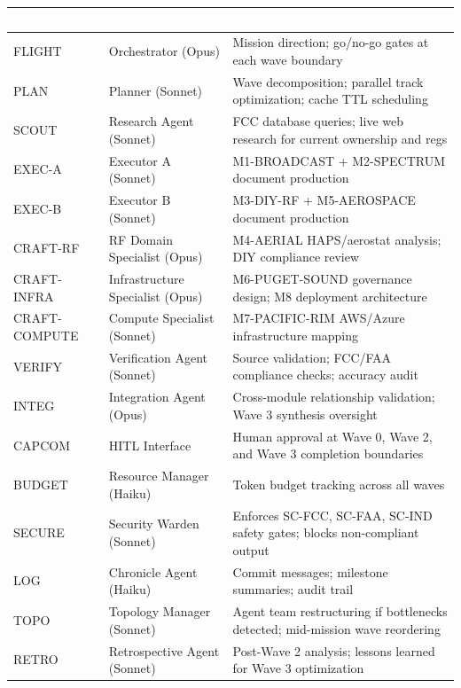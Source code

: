 \documentclass[11pt,letterpaper]{article}
\newcommand{\tableheader}[1]{\textbf{\sffamily\textcolor{white}{#1}}}
\begin{document}
\begin{center}
\begin{tabularx}{\textwidth}{L{2cm}L{3.5cm}X}
\toprule
{}
\tableheader{Role} & \tableheader{Agent} & \tableheader{Responsibility} \\
\midrule
FLIGHT & Orchestrator (Opus) & Mission direction; go/no-go gates at each wave boundary \\
PLAN & Planner (Sonnet) & Wave decomposition; parallel track optimization; cache TTL scheduling \\
SCOUT & Research Agent (Sonnet) & FCC database queries; live web research for current ownership and regs \\
EXEC-A & Executor A (Sonnet) & M1-BROADCAST + M2-SPECTRUM document production \\
EXEC-B & Executor B (Sonnet) & M3-DIY-RF + M5-AEROSPACE document production \\
CRAFT-RF & RF Domain Specialist (Opus) & M4-AERIAL HAPS/aerostat analysis; DIY compliance review \\
CRAFT-INFRA & Infrastructure Specialist (Opus) & M6-PUGET-SOUND governance design; M8 deployment architecture \\
CRAFT-COMPUTE & Compute Specialist (Sonnet) & M7-PACIFIC-RIM AWS/Azure infrastructure mapping \\
VERIFY & Verification Agent (Sonnet) & Source validation; FCC/FAA compliance checks; accuracy audit \\
INTEG & Integration Agent (Opus) & Cross-module relationship validation; Wave 3 synthesis oversight \\
CAPCOM & HITL Interface & Human approval at Wave 0, Wave 2, and Wave 3 completion boundaries \\
BUDGET & Resource Manager (Haiku) & Token budget tracking across all waves \\
SECURE & Security Warden (Sonnet) & Enforces SC-FCC, SC-FAA, SC-IND safety gates; blocks non-compliant output \\
LOG & Chronicle Agent (Haiku) & Commit messages; milestone summaries; audit trail \\
TOPO & Topology Manager (Sonnet) & Agent team restructuring if bottlenecks detected; mid-mission wave reordering \\
RETRO & Retrospective Agent (Sonnet) & Post-Wave 2 analysis; lessons learned for Wave 3 optimization \\
\bottomrule
\end{tabularx}
\end{center}
\end{document}
